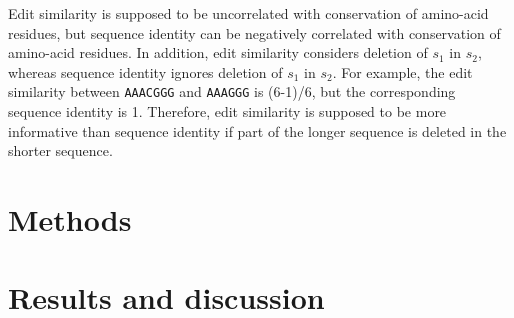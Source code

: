 \documentclass[]{article}
\begin{document}
Edit similarity is supposed to be uncorrelated with conservation of amino-acid residues, but sequence identity can be negatively correlated with conservation of amino-acid residues.
In addition, edit similarity considers deletion of \(s_1\) in \(s_2\), whereas sequence identity ignores deletion of \(s_1\) in \(s_2\).
For example, the edit similarity between \texttt{AAACGGG} and \texttt{AAAGGG} is (6-1)/6, but the corresponding sequence identity is 1. Therefore, edit similarity is supposed to be more informative than sequence identity if part of the longer sequence is deleted in the shorter sequence.

\section{Methods}



\section{Results and discussion}
\end{document}
